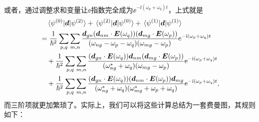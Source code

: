或者，通过调整求和变量让$\ee$指数完全成为$\ee^{- \ii (\omega_p + \omega_q) t}$，上式就是
\begin{equation}
    \begin{aligned}
        &\quad \mel*{\psi^{(0)}}{\vb*{d}}{\psi^{(2)}} + \mel*{\psi^{(2)}}{\vb*{d}}{\psi^{(0)}} + \mel*{\psi^{(1)}}{\vb*{d}}{\psi^{(1)}} \\
        &= \frac{1}{\hbar^2} \sum_{p, q} \sum_{m, n} \frac{\vb*{d}_{gn} (\vb*{d}_{nm} \cdot \vb*{E}(\omega_q)) (\vb*{d}_{mg} \cdot \vb*{E}(\omega_p))}{(\omega_{ng} - \omega_p - \omega_q) (\omega_{mg} - \omega_p)} \mathrm{e}^{-\mathrm{i} (\omega_p + \omega_q) t} \\
        &\quad + \frac{1}{\hbar^2} \sum_{p, q} \sum_{m, n} \frac{(\vb*{d}_{gn} \cdot \vb*{E}(\omega_q)) \vb*{d}_{nm} (\vb*{d}_{mg} \cdot \vb*{E}(\omega_p))}{(\omega_{ng}^* + \omega_q) (\omega_{mg} - \omega_p)} \mathrm{e}^{-\mathrm{i} (\omega_p + \omega_q) t} \\
        &\quad + \frac{1}{\hbar^2} \sum_{p, q} \sum_{m, n} \frac{ (\vb*{d}_{gn} \cdot \vb*{E}(\omega_q)) (\vb*{d}_{nm} \cdot \vb*{E}(\omega_p)) \vb*{d}_{mg} }{(\omega_{ng}^* + \omega_q) (\omega_{mg}^* + \omega_p + \omega_q)} \mathrm{e}^{- \mathrm{i} (\omega_p + \omega_q) t},
    \end{aligned}
\end{equation}
而三阶项就更加繁琐了。实际上，我们可以将这些计算总结为一套费曼图，其规则如下：
